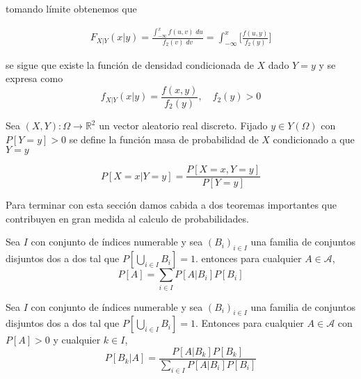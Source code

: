     \noindent tomando límite obtenemos que 
    
    \begin{equation}
        \begin{aligned}
            F_{X|Y}(x|y) = \frac{ \int_{-\infty}^{x}f(u,v) \; du}{ f_2(v) \; dv} = \int_{-\infty}^{x} \Big[ \frac{f(u,y)}{f_2(y)} \Big]
        \end{aligned}
    \end{equation}
    
    \noindent se sigue que existe la función de densidad condicionada de $X$ dado $Y=y$ y se expresa como 
    \begin{equation}
        f_{X|Y}(x | y) = \frac{f(x,y)}{f_2(y)}, \quad f_2(y) > 0
    \end{equation}
    
    \begin{definicion}
    
        Sea $(X,Y):\Omega \to \mathbb{R}^2$ un vector aleatorio real discreto. Fijado $y \in Y(\Omega)$ con $P[Y = y] > 0$ se define la función masa de probabilidad de $X$ condicionado a que $Y=y$
        
        \begin{equation}
            P [X = x | Y = y] = \frac{P[X=x, Y=y]}{P[Y=y]}
        \end{equation}
    \end{definicion}


    Para terminar con esta sección damos cabida a dos teoremas importantes que contribuyen en gran medida al calculo de probabilidades. \\
    
    \begin{teorema}
    
        Sea $I$ con conjunto de índices numerable y sea $(B_i)_{i \in I}$ una familia de conjuntos disjuntos dos a dos tal que $P[\bigcup_{i\in I}B_i] = 1$. entonces para cualquier $A \in \mathcal{A}$,
        \begin{equation}
            P[A] = \sum_{i \in I} P[A|B_i] P[B_i]
        \end{equation}
    
    \end{teorema}
    
    \begin{teorema}
        Sea $I$ con conjunto de índices numerable y sea $(B_i)_{i \in I}$ una familia de conjuntos disjuntos dos a dos tal que $P[\bigcup_{i\in I}B_i] = 1$. Entonces para cualquier $A \in \mathcal{A}$ con $P[A] > 0$ y cualquier $k \in I$,
        \begin{equation}
            P[B_k|A] = \frac{P[A|B_k] P[B_k]}{\sum_{i \in I} P[A|B_i] P[B_i]}
        \end{equation}
    \end{teorema}   
   
